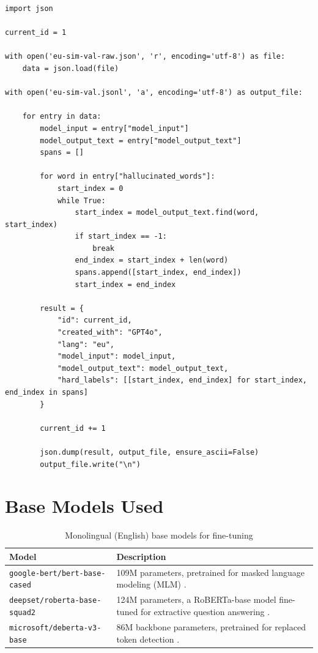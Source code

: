 \documentclass[11pt]{article}
\begin{document}
\begin{lstlisting}
import json

current_id = 1  

with open('eu-sim-val-raw.json', 'r', encoding='utf-8') as file:
    data = json.load(file)

with open('eu-sim-val.jsonl', 'a', encoding='utf-8') as output_file:

    for entry in data:
        model_input = entry["model_input"]
        model_output_text = entry["model_output_text"]
        spans = []

        for word in entry["hallucinated_words"]:
            start_index = 0
            while True:
                start_index = model_output_text.find(word, start_index)  
                if start_index == -1:
                    break
                end_index = start_index + len(word)
                spans.append([start_index, end_index])
                start_index = end_index 

        result = {
            "id": current_id, 
            "created_with": "GPT4o",
            "lang": "eu",  
            "model_input": model_input,
            "model_output_text": model_output_text,
            "hard_labels": [[start_index, end_index] for start_index, end_index in spans]
        }

        current_id += 1

        json.dump(result, output_file, ensure_ascii=False)
        output_file.write("\n")
\end{lstlisting}

\clearpage

\newpage
\section{Base Models Used}
\label{sec:appendix}
\begin{table}[h]
    \centering
    \captionsetup{justification=centering, singlelinecheck=false}    \renewcommand{\arraystretch}{1.5}  %
    \begin{tabular}{|l|p{8.5cm}|}
        \hline
        \textbf{Model} & \textbf{Description} \\ \hline\hline
        \texttt{google-bert/bert-base-cased}   &  109M parameters, pretrained for masked language modeling (MLM) \cite{DBLP:journals/corr/abs-1810-04805}. \\ 
        \hline
        \texttt{deepset/roberta-base-squad2}   & 124M parameters, a RoBERTa-base model fine-tuned for extractive question answering \cite{deepset_roberta_squad2}. \\ 
        \hline
        \texttt{microsoft/deberta-v3-base}  & 86M backbone parameters, pretrained for replaced token detection \cite{he2021debertav3}. \\ 
        \hline
    \end{tabular}
    \caption{Monolingual (English) base models for fine-tuning}
    \label{tab:monolingual_models}
\end{table}
\end{document}
